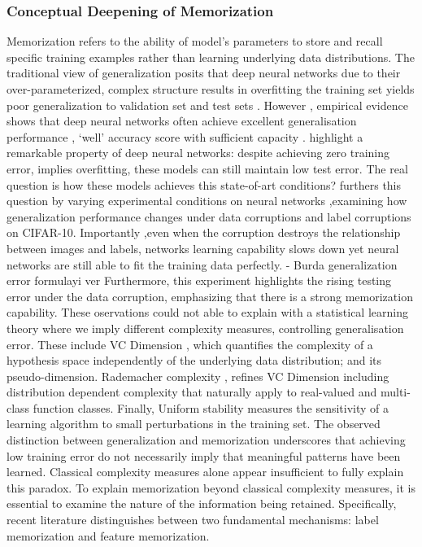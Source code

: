 \subsubsection{Conceptual Deepening of Memorization}
Memorization refers to the ability of model’s parameters to store and recall specific training examples rather than learning underlying data distributions. The traditional view of generalization posits that deep neural networks due to their over-parameterized, complex structure results in overfitting the training set yields poor generalization to validation set and test sets \cite{ian_goodfellow_5e6a80c8}. However , empirical evidence shows that deep neural networks often achieve excellent generalisation performance , ‘well’ accuracy score with sufficient capacity \cite{devansh_arpit_9e68508c}. \cite{chiyuan_zhang_bd8f0549} highlight a remarkable property of deep neural networks: despite achieving zero training error, implies overfitting, these models can still maintain low test error. The real question is how these models achieves this state-of-art conditions? \cite{chiyuan_zhang_bd8f0549}furthers this question by varying experimental conditions on neural networks ,examining how generalization performance changes under data corruptions and label corruptions on CIFAR-10.  Importantly ,even when the corruption destroys the relationship between images and labels, networks learning capability slows down yet neural networks are still able to fit  the training data perfectly. 
- Burda generalization error formulayi ver
Furthermore, this experiment highlights the rising testing error under the data corruption, emphasizing that there is a strong memorization capability. These oservations could not able to explain with a statistical learning theory where we imply different complexity measures, controlling generalisation error. These include VC Dimension \cite{vladimir_vapnik_d1c1a1dc}, which quantifies the complexity of a hypothesis space independently of the underlying data distribution; and its pseudo-dimension. Rademacher complexity \cite{shai_shalev_shwartz_c0318cbc}, refines VC Dimension including distribution dependent complexity that naturally apply to real-valued  and multi-class function classes. Finally, Uniform stability measures the sensitivity of a learning algorithm to small perturbations in the training set.
The observed distinction between generalization and memorization underscores that achieving low training error do not necessarily imply that meaningful patterns have been learned. Classical complexity measures alone appear insufficient to fully explain this paradox. To explain memorization beyond classical complexity measures, it is essential to examine the nature of the information being retained. Specifically, recent literature distinguishes between two fundamental mechanisms: label memorization and feature memorization. 
